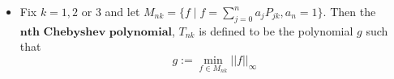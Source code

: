 \documentclass[a0, landscape]{a0poster}
\begin{document}
{\begin{textblock*}{12in}
\begin{minipage}{12in}
\begin{itemize}
            $$\langle f,g\rangle_{H^m}= \sum\limits_{l = 0}^m \lambda_l\int_{SG}\Delta ^lf\Delta ^lg\,d\mu+\sum\limits_{l=0}^{m-1}\beta_l\,\varepsilon(\Delta ^l f,\Delta ^l g)+\nonumber$$
            $$\sum\limits_{l=0}^{m-1}[\Delta  ^lf(q_0)\,\Delta  ^lf(q_1)\,\Delta  ^lf(q_2)] M_l [\Delta  ^lg(q_0)\,\Delta  ^lg(q_1)\,\Delta  ^lg(q_2)]^T$$
            
            Here $\lambda_l, \beta_l >0$ and $M$ is a $3\times3$ symmetric positive definite matrix. For most of our results we use the $H^1$ inner product where $m=1$ and $M = 0$. 
            \item Fix $k=1,2$ or $3$ and let $M_{nk} = \{f \mid f = \sum_{j=0}^{n}a_jP_{jk}, a_n=1\}$. Then the $\textbf{nth Chebyshev polynomial}$, $T_{nk}$ is defined to be the polynomial $g$ such that 
            $$ g := \min_{f \in M_{nk}}||f||_{\infty}$$
        \end{itemize}
  \end{minipage}%
  \end{textblock*}%
}
\end{document}
